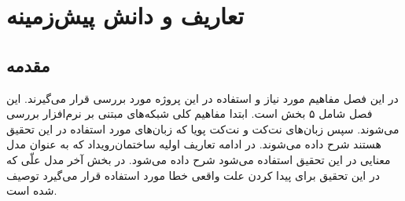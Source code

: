 \chapter{تعاریف و دانش پیش‌زمینه}
\section{مقدمه}
در این فصل مفاهیم مورد نیاز و استفاده در این پروژه مورد بررسی قرار می‌گیرند.
این فصل شامل ۵ بخش است.
ابتدا مفاهیم کلی شبکه‌های مبتنی بر نرم‌افزار بررسی می‌شوند.
سپس زبان‌های نت‌کت
و نت‌کت پویا
که زبان‌های مورد استفاده در این تحقیق هستند شرح داده می‌شوند.
در ادامه تعاریف اولیه ساختمان‌رویداد
که به عنوان مدل معنایی در این تحقیق استفاده می‌شود شرح داده می‌شود.
در بخش آخر مدل علّی
که در این تحقیق برای پیدا کردن علت واقعی خطا مورد استفاده قرار می‌گیرد توصیف شده است.











